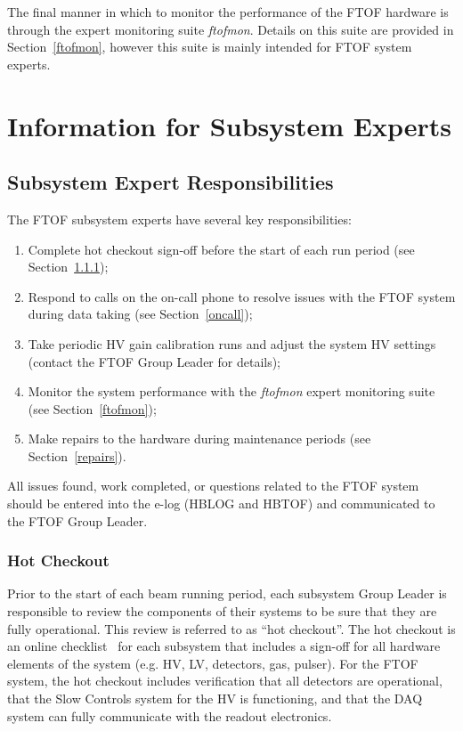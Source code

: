 \documentclass[12pt]{article}
\begin{document}
The final manner in which to monitor the performance of the FTOF hardware is through the expert
monitoring suite {\it ftofmon}. Details on this suite are provided in Section~\ref{ftofmon}, however
this suite is mainly intended for FTOF system experts.

\section{Information for Subsystem Experts}

\subsection{Subsystem Expert Responsibilities}

The FTOF subsystem experts have several key responsibilities:

\begin{enumerate}
\item Complete hot checkout sign-off before the start of each run period (see 
Section~\ref{checkout});
\item Respond to calls on the on-call phone to resolve issues with the FTOF system 
during data taking (see Section~\ref{oncall});
\item Take periodic HV gain calibration runs and adjust the system HV settings (contact
the FTOF Group Leader for details);
\item Monitor the system performance with the {\it ftofmon} expert monitoring suite
(see Section~\ref{ftofmon});
\item Make repairs to the hardware during maintenance periods (see Section~\ref{repairs}).
\end{enumerate}

All issues found, work completed, or questions related to the FTOF system should be 
entered into the e-log (HBLOG and HBTOF) and communicated to the FTOF Group Leader.

\subsubsection{Hot Checkout}
\label{checkout}

Prior to the start of each beam running period, each subsystem Group Leader is 
responsible to review the components of their systems to be sure that they are fully 
operational. This review is referred to as ``hot checkout''. The hot checkout is an 
online checklist~\cite{hco-page} for each subsystem that includes a sign-off for all
hardware elements of the system (e.g. HV, LV, detectors, gas, pulser). For the FTOF
system, the hot checkout includes verification that all detectors are operational, that the
Slow Controls system for the HV is functioning, and that the DAQ system can fully
communicate with the readout electronics. 
\end{document}
